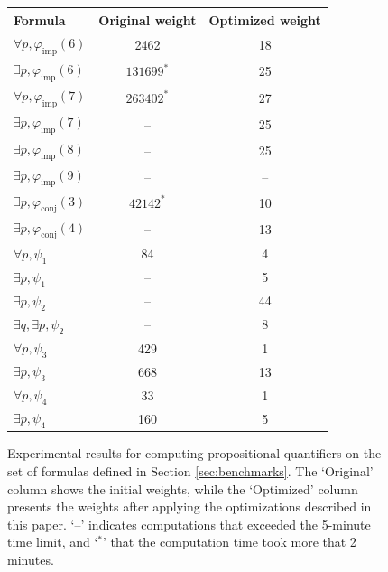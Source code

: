 \documentclass[english,review]{jflart}
\theoremstyle{definition}
\theoremstyle{plain}
\renewcommand{\phi}{\varphi}
\begin{document}
\begin{figure}[htp]
	\centering
	\begin{tabular}{|l||c|c|}
		\hline
		Formula                             & Original weight & Optimized weight \\
		\hline
		$\forall p, \phi_{\text{imp}} (6)$  & 2462            & 18               \\
		$\exists p, \phi_{\text{imp}} (6)$  & $131699^*$      & 25               \\
		$\forall p, \phi_{\text{imp}} (7)$  & $263402^*$      & 27               \\
		$\exists p, \phi_{\text{imp}} (7)$  & --              & 25               \\
		$\exists p, \phi_{\text{imp}} (8)$  & --              & 25               \\
		$\exists p, \phi_{\text{imp}} (9)$  & --              & --               \\
		$\exists p, \phi_{\text{conj}} (3)$ & $42142^*$       & 10               \\
		$\exists p, \phi_{\text{conj}} (4)$ & --              & 13               \\
		$\forall p, \psi_1$                 & 84              & 4                \\
		$\exists p, \psi_1$                 & --              & 5                \\
		$\exists p, \psi_2$                 & --              & 44               \\
		$\exists q, \exists p, \psi_2$      & --              & 8                \\
		$\forall p, \psi_3$                 & 429             & 1                \\
		$\exists p, \psi_3$                 & 668             & 13               \\
		$\forall p, \psi_4$                 & 33              & 1                \\
		$\exists p, \psi_4$                 & 160             & 5                \\
		\hline
	\end{tabular}
	\caption{Experimental results for computing propositional quantifiers on the set of formulas defined in Section \ref{sec:benchmarks}. The `Original' column shows the initial weights, while the `Optimized' column presents the weights after applying the optimizations described in this paper. `--' indicates computations that exceeded the 5-minute time limit, and `$^*$' that the computation time took more that 2 minutes.}
	\label{tab:quant-improvements}
\end{figure}
\end{document}
